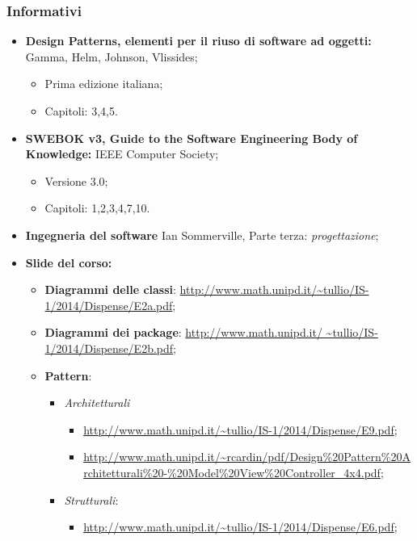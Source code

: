 \subsubsection{Informativi}
	\begin{itemize}
		\item \textbf{Design Patterns, elementi per il riuso di software ad oggetti:} Gamma, Helm, Johnson, Vlissides;
		\begin{itemize}
			\item Prima edizione italiana;
			\item Capitoli: 3,4,5.			
		\end{itemize}
		
		\item \textbf{SWEBOK v3, Guide to the Software Engineering Body of Knowledge:} IEEE Computer Society;
		\begin{itemize}
			\item Versione 3.0;
			\item Capitoli: 1,2,3,4,7,10.			
		\end{itemize}
		\item \textbf{Ingegneria del software} Ian Sommerville, Parte terza: \textit{progettazione};
		\item \textbf{Slide del corso:}
				\begin{itemize}
					\item \textbf{Diagrammi delle classi}: \url{http://www.math.unipd.it/~tullio/IS-1/2014/Dispense/E2a.pdf};
					\item \textbf{Diagrammi dei package}: \url{http://www.math.unipd.it/ ~tullio/IS-1/2014/Dispense/E2b.pdf};
					\item \textbf{Pattern}:
					\begin{itemize}
						\item \textit{Architetturali}
							\begin{itemize}
								\item \url{http://www.math.unipd.it/~tullio/IS-1/2014/Dispense/E9.pdf};
								\item \url{http://www.math.unipd.it/~rcardin/pdf/Design\%20Pattern\%20Architetturali\%20-\%20Model\%20View\%20Controller\_4x4.pdf};
							\end{itemize}
						\item \textit{Strutturali}:
						\begin{itemize}
						\item \url{http://www.math.unipd.it/~tullio/IS-1/2014/Dispense/E6.pdf};
						\end{itemize}

\end{itemize}
\end{itemize}
\end{itemize}
